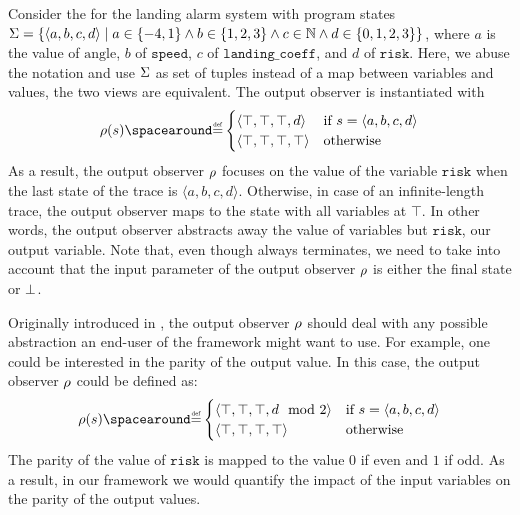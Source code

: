 \begin{example}
  Consider the  for the landing alarm system with program states $\Sigma=\{\langle a, b, c, d \rangle \mid a\in\{-4,1\}\land b\in\{1,2,3\}\land c\in\mathbb{N} \land d\in\{0,1,2,3\}\}$, where $a$ is the value of $\text{angle}$, $b$ of $\texttt{speed}$, $c$ of $\texttt{landing\_coeff}$, and $d$ of $\texttt{risk}$.
  Here, we abuse the notation and use $\Sigma$ as set of tuples instead of a map between variables and values, the two views are equivalent.
  The output observer is instantiated with
  \[
  \outputobs(\defstate) \DefeQ \begin{cases}
    \langle \top, \top, \top, d \rangle & \text{if } \defstate = \langle a, b, c, d \rangle \\
    \langle \top, \top, \top, \top \rangle & \text{otherwise}
  \end{cases}
  \]
  As a result, the output observer $\rho$ focuses on the value of the variable $\texttt{risk}$ when the last state of the trace is $\langle a, b, c, d \rangle$. Otherwise, in case of an infinite-length trace, the output observer maps to the state with all variables at $\top$.
  In other words, the output observer abstracts away the value of variables but $\texttt{risk}$, our output variable.
  Note that, even though  always terminates, we need to take into account that the input parameter of the output observer $\rho$ is either the final state or $\bot$.
\end{example}

\begin{example}
  Originally introduced in , the output observer $\rho$ should deal with any possible abstraction an end-user of the framework might want to use.
  For example, one could be interested in the parity of the output value.
  In this case, the output observer $\rho$ could be defined as:
  \[
  \outputobs(\defstate) \DefeQ \begin{cases}
    \langle \top, \top, \top, d \mod 2 \rangle & \text{if } \defstate = \langle a, b, c, d \rangle \\
    \langle \top, \top, \top, \top \rangle & \text{otherwise}
  \end{cases}
  \]
  The parity of the value of $\texttt{risk}$ is mapped to the value $0$ if even and $1$ if odd.
  As a result, in our framework we would quantify the impact of the input variables on the parity of the output values.
\end{example}


